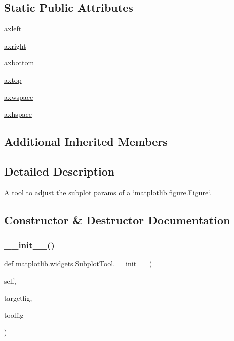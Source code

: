 \subsection*{Static Public Attributes}
\begin{DoxyCompactItemize}
\item 
\hyperlink{classmatplotlib_1_1widgets_1_1SubplotTool_a365a8a7a80e466966f7becc12edc3ec9}{axleft}
\item 
\hyperlink{classmatplotlib_1_1widgets_1_1SubplotTool_a037fb0ed2dcacdcd5b897625e19777fa}{axright}
\item 
\hyperlink{classmatplotlib_1_1widgets_1_1SubplotTool_a08aa698ee358fa5ffb6ec27d5bd2c44d}{axbottom}
\item 
\hyperlink{classmatplotlib_1_1widgets_1_1SubplotTool_ae34a4459ec0cb58a0cdad71d44e7df32}{axtop}
\item 
\hyperlink{classmatplotlib_1_1widgets_1_1SubplotTool_a4edc89a797dcc83497752b272109dcb5}{axwspace}
\item 
\hyperlink{classmatplotlib_1_1widgets_1_1SubplotTool_aaca6d495cd59b09d0655c21856b7d7ea}{axhspace}
\end{DoxyCompactItemize}
\subsection*{Additional Inherited Members}


\subsection{Detailed Description}
\begin{DoxyVerb}A tool to adjust the subplot params of a `matplotlib.figure.Figure`.
\end{DoxyVerb}
 

\subsection{Constructor \& Destructor Documentation}
\mbox{\label{classmatplotlib_1_1widgets_1_1SubplotTool_aafe5aa2e2b85f7c2ed28f6659305f8ca}} 
\subsubsection{\texorpdfstring{\+\_\+\+\_\+init\+\_\+\+\_\+()}{\_\_init\_\_()}}
{\footnotesize\ttfamily def matplotlib.\+widgets.\+Subplot\+Tool.\+\_\+\+\_\+init\+\_\+\+\_\+ (\begin{DoxyParamCaption}\item[{}]{self,  }\item[{}]{targetfig,  }\item[{}]{toolfig }\end{DoxyParamCaption})}

